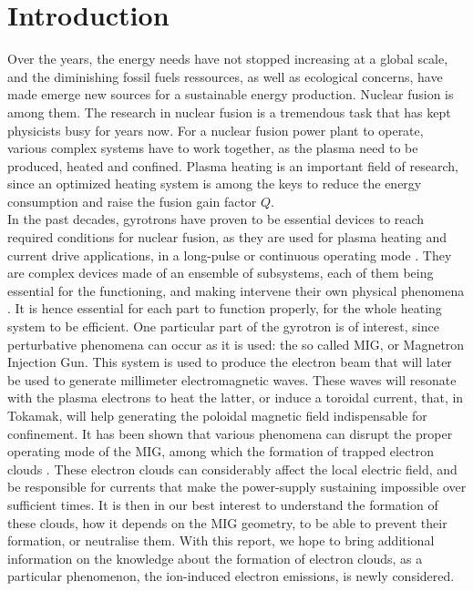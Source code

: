 \section{Introduction}

Over the years, the energy needs have not stopped increasing at a global scale, and the diminishing fossil fuels ressources, as well as ecological concerns, have made emerge new sources for a sustainable energy production. Nuclear fusion is among them. The research in nuclear fusion is a tremendous task that has kept physicists busy for years now. For a nuclear fusion power plant to operate, various complex systems have to  work together, as the plasma need to be produced, heated and confined. Plasma heating is an important field of research, since an optimized heating system is among the keys to reduce the energy consumption and raise the fusion gain factor $Q$. \\

In the past decades, gyrotrons have proven to be essential devices to reach required conditions for nuclear fusion, as they are used for plasma heating and current drive applications, in a long-pulse or continuous operating mode \cite{Fisch}. They are complex devices made of an ensemble of subsystems, each of them being essential for the functioning, and making intervene their own physical phenomena \cite{ITER_gyrotrons}. It is hence essential for each part to function properly, for the whole heating system to be efficient. One particular part of the gyrotron is of interest, since perturbative phenomena can occur as it is used: the so called MIG, or Magnetron Injection Gun. This system is used to produce the electron beam that will later be used to generate millimeter electromagnetic waves. These waves will resonate with the plasma electrons to heat the latter, or induce a toroidal current, that, in Tokamak, will help generating the poloidal magnetic field indispensable for confinement. It has been shown that various phenomena can disrupt the proper operating mode of the MIG, among which the formation of trapped electron clouds \cite{lebars_et_al}. These electron clouds can considerably affect the local electric field, and be responsible for currents that make the power-supply sustaining impossible over sufficient times. It is then in our best interest to understand the formation of these clouds, how it depends on the MIG geometry, to be able to prevent their formation, or neutralise them. With this report, we hope to bring additional information on the knowledge about the formation of electron clouds, as a particular phenomenon, the ion-induced electron emissions, is newly considered. \\

